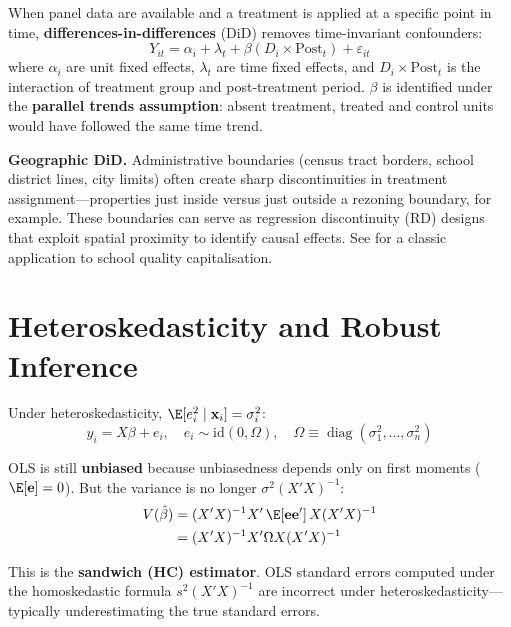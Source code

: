 When panel data are available and a treatment is applied at a specific point
in time, \textbf{differences-in-differences}
(DiD) removes time-invariant confounders:
\begin{equation}
  Y_{it} = \alpha_i + \lambda_t + \beta(D_i \times \text{Post}_t) + \varepsilon_{it}
\end{equation}
where $\alpha_i$ are unit fixed effects, $\lambda_t$ are time fixed effects,
and $D_i \times \text{Post}_t$ is the interaction of treatment group and
post-treatment period. $\beta$ is identified under the
\textbf{parallel trends assumption}: absent treatment, treated and control
units would have followed the same time trend.

\noindent\textbf{Geographic DiD.} Administrative boundaries (census tract
borders, school district lines, city limits) often create sharp discontinuities
in treatment assignment---properties just inside versus just outside a
rezoning boundary, for example. These boundaries can serve as regression
discontinuity (RD) designs that exploit spatial proximity to identify causal
effects. See \citet{Black1999} for a classic application to school quality
capitalisation.



\section{Heteroskedasticity and Robust Inference}
\label{sec_Heterosk}

Under heteroskedasticity, $\E[e_i^2\mid\mathbf{x}_i] = \sigma_i^2$:
\begin{equation}
  y_i = X\beta + e_i, \quad
  e_i \sim \text{id}(0, \Omega), \quad
  \Omega \equiv \operatorname{diag}(\sigma_1^2,\ldots,\sigma_n^2)
\end{equation}

OLS is still \textbf{unbiased} because unbiasedness depends only on first
moments ($\E[\mathbf{e}]=0$). But the variance is no longer $\sigma^2(X'X)^{-1}$:
\begin{align}
  V(\hat\beta)
  &= (X'X)^{-1}X'\,\E[\mathbf{e}\mathbf{e}']\,X(X'X)^{-1} \nonumber \\
  &= (X'X)^{-1}X'\Omega X(X'X)^{-1}
  \label{eq_SandwichVar}
\end{align}

This is the \textbf{sandwich (HC) estimator}. OLS
standard errors computed under the homoskedastic formula $s^2(X'X)^{-1}$ are
incorrect under heteroskedasticity---typically underestimating the true
standard errors.

